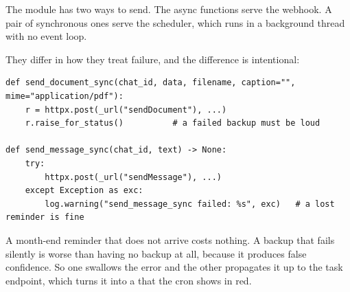 The module has two ways to send. The async functions serve the webhook. A pair
of synchronous ones serve the scheduler, which runs in a background thread with
no event loop.

They differ in how they treat failure, and the difference is intentional:

\begin{lstlisting}[style=py]
def send_document_sync(chat_id, data, filename, caption="", mime="application/pdf"):
    r = httpx.post(_url("sendDocument"), ...)
    r.raise_for_status()          # a failed backup must be loud

def send_message_sync(chat_id, text) -> None:
    try:
        httpx.post(_url("sendMessage"), ...)
    except Exception as exc:
        log.warning("send_message_sync failed: %s", exc)   # a lost reminder is fine
\end{lstlisting}

A month-end reminder that does not arrive costs nothing. A backup that fails
silently is worse than having no backup at all, because it produces false
confidence. So one swallows the error and the other propagates it up to the task
endpoint, which turns it into a  that the cron shows in red.
